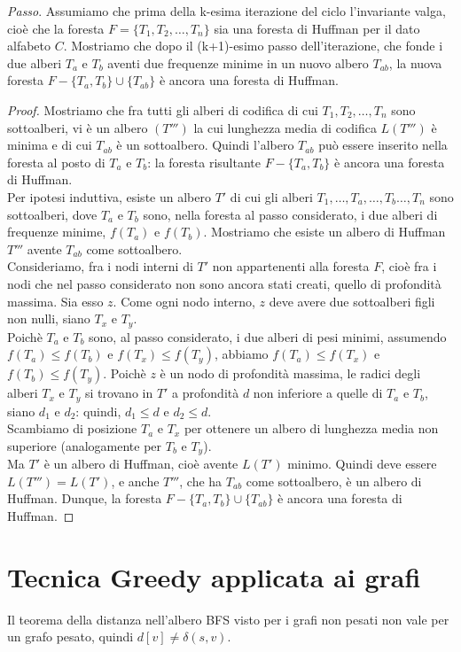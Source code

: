 \documentclass[11pt]{book}
\begin{document}
\textit{Passo}. Assumiamo che prima della k-esima iterazione del ciclo l'invariante valga, cioè che la foresta 
$F=\{T_1,T_2,\dots,T_n\}$ sia una foresta di Huffman per il dato alfabeto $C$. Mostriamo che dopo il (k+1)-esimo passo 
dell'iterazione, che fonde i due alberi $T_a$ e $T_b$ aventi due frequenze minime in un nuovo albero $T_{ab}$, la nuova 
foresta $F-\{T_a,T_b\}\cup\{T_{ab}\}$ è ancora una foresta di Huffman.
\begin{proof}
    Mostriamo che fra tutti gli alberi di codifica di cui $T_1,T_2,\dots,T_n$ sono sottoalberi, vi è un albero $(T''')$ 
    la cui lunghezza media di codifica $L(T''')$ è minima e di cui $T_{ab}$ è un sottoalbero. Quindi l'albero $T_{ab}$ può 
    essere inserito nella foresta al posto di $T_a$ e $T_b$: la foresta risultante $F-\{T_a,T_b\}$ è ancora una foresta 
    di Huffman.\\
    Per ipotesi induttiva, esiste un albero $T'$ di cui gli alberi $T_1,\dots,T_a,\dots,T_b\dots,T_n$ sono sottoalberi, 
    dove $T_a$ e $T_b$ sono, nella foresta al passo considerato, i due alberi di frequenze minime, $f(T_a)$ e $f(T_b)$. 
    Mostriamo che esiste un albero di Huffman $T'''$ avente $T_{ab}$ come sottoalbero.\\
    Consideriamo, fra i nodi interni di $T'$ non appartenenti alla foresta $F$, cioè fra i nodi che nel passo considerato 
    non sono ancora stati creati, quello di profondità massima. Sia esso $z$. Come ogni nodo interno, $z$ deve avere due 
    sottoalberi figli non nulli, siano $T_x$ e $T_y$.\\
    Poichè $T_a$ e $T_b$ sono, al passo considerato, i due alberi di pesi minimi, assumendo $f(T_a)\leq f(T_b)$ e $f(T_x)\leq f(T_y)$,
    abbiamo $f(T_a)\leq f(T_x)$ e $f(T_b)\leq f(T_y)$. Poichè $z$ è un nodo di profondità massima, le radici degli alberi $T_x$ 
    e $T_y$ si trovano in $T'$ a profondità $d$ non inferiore a quelle di $T_a$ e $T_b$, siano $d_1$ e $d_2$: quindi, 
    $d_1\leq d$ e $d_2\leq d$.\\
    Scambiamo di posizione $T_a$ e $T_x$ per ottenere un albero di lunghezza media non superiore (analogamente per $T_b$
    e $T_y$).\\
    Ma $T'$ è un albero di Huffman, cioè avente $L(T')$ minimo. Quindi deve essere $L(T''')=L(T')$, e anche $T'''$, che 
    ha $T_{ab}$ come sottoalbero, è un albero di Huffman. Dunque, la foresta $F-\{T_a,T_b\}\cup\{T_{ab}\}$ è ancora una 
    foresta di Huffman.
\end{proof}
\chapter{Tecnica Greedy applicata ai grafi}
Il teorema della distanza nell'albero BFS visto per i grafi non pesati non vale per un grafo pesato, quindi $d[v]\neq\delta(s,v)$.
\end{document}
